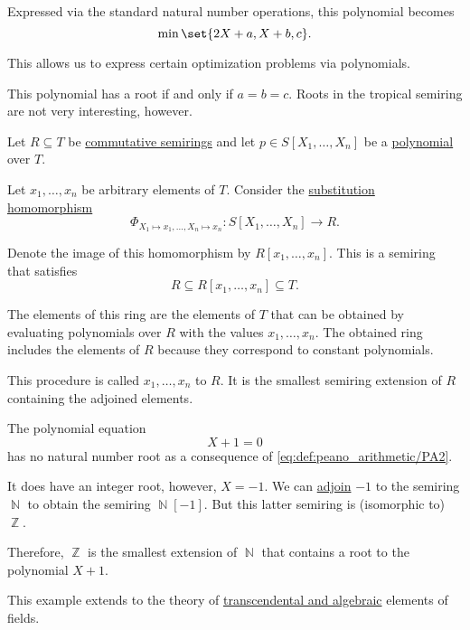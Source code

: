 \begin{example}
\begin{thmenum}
    Expressed via the standard natural number operations, this polynomial becomes
    \begin{equation*}
      \min\set{ 2X + a, X + b, c }.
    \end{equation*}

    This allows us to express certain optimization problems via polynomials.

    This polynomial has a root if and only if \( a = b = c \). Roots in the tropical semiring are not very interesting, however.
  \end{thmenum}
\end{example}

\begin{remark}\label{rem:adjoining_via_polynomials}
  Let \( R \subseteq T \) be \hyperref[def:semiring/commutative]{commutative semirings} and let \( p \in S[X_1, \ldots, X_n] \) be a \hyperref[def:polynomial_semiring]{polynomial} over \( T \).

  Let \( x_1, \ldots, x_n \) be arbitrary elements of \( T \). Consider the \hyperref[thm:polynomial_semiring_universal_property]{substitution homomorphism}
  \begin{equation*}
    \Phi_{X_1 \mapsto x_1, \ldots, X_n \mapsto x_n}: S[X_1, \ldots, X_n] \to R.
  \end{equation*}

  Denote the image of this homomorphism by \( R[x_1, \ldots, x_n] \). This is a semiring that satisfies
  \begin{equation*}
    R \subseteq R[x_1, \ldots, x_n] \subseteq T.
  \end{equation*}

  The elements of this ring are the elements of \( T \) that can be obtained by evaluating polynomials over \( R \) with the values \( x_1, \ldots, x_n \). The obtained ring includes the elements of \( R \) because they correspond to constant polynomials.

  This procedure is called  \( x_1, \ldots, x_n \) to \( R \). It is the smallest semiring extension of \( R \) containing the adjoined elements.
\end{remark}

\begin{example}\label{ex:adjoining_root}
  The polynomial equation
  \begin{equation*}
    X + 1 = 0
  \end{equation*}
  has no natural number root as a consequence of \eqref{eq:def:peano_arithmetic/PA2}.

  It does have an integer root, however, \( X = -1 \). We can \hyperref[rem:adjoining_via_polynomials]{adjoin} \( -1 \) to the semiring \( \BbbN \) to obtain the semiring \( \BbbN[-1] \). But this latter semiring is (isomorphic to) \( \BbbZ \).

  Therefore, \( \BbbZ \) is the smallest extension of \( \BbbN \) that contains a root to the polynomial \( X + 1 \).

  This example extends to the theory of \hyperref[def:transcendetal_element]{transcendental and algebraic} elements of fields.
\end{example}

